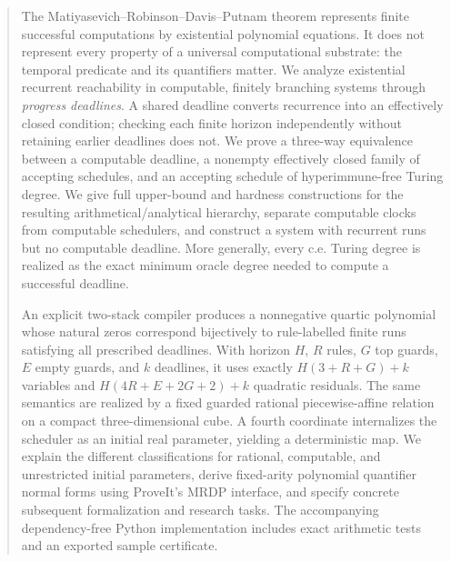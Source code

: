 \documentclass[11pt,letterpaper]{article}
\theoremstyle{definition}
\theoremstyle{remark}
\newcommand{\1}{\mathbf 1}
\begin{document}
\begin{quote}\small
The Matiyasevich--Robinson--Davis--Putnam theorem represents finite successful
computations by existential polynomial equations. It does not represent every
property of a universal computational substrate: the temporal predicate and
its quantifiers matter. We analyze existential recurrent reachability in
computable, finitely branching systems through \emph{progress deadlines}.
A shared deadline converts recurrence into an effectively closed condition;
checking each finite horizon independently without retaining earlier deadlines
does not. We prove a three-way equivalence between a computable deadline,
a nonempty effectively closed family of accepting schedules, and an accepting
schedule of hyperimmune-free Turing degree. We give full upper-bound and
hardness constructions for the resulting arithmetical/analytical hierarchy,
separate computable clocks from computable schedulers, and construct a system
with recurrent runs but no computable deadline. More generally, every c.e.
Turing degree is realized as the exact minimum oracle degree needed to
compute a successful deadline.

An explicit two-stack compiler produces a nonnegative quartic polynomial
whose natural zeros correspond bijectively to rule-labelled finite runs
satisfying all prescribed deadlines. With horizon $H$, $R$ rules, $G$ top
guards, $E$ empty guards, and $k$ deadlines, it uses exactly
$H(3+R+G)+k$ variables and $H(4R+E+2G+2)+k$ quadratic residuals.
The same semantics are realized by a fixed guarded rational piecewise-affine
relation on a compact three-dimensional cube. A fourth coordinate internalizes
the scheduler as an initial real parameter, yielding a deterministic map.
We explain the different classifications for rational, computable, and
unrestricted initial parameters, derive fixed-arity polynomial quantifier
normal forms using ProveIt's MRDP interface, and specify concrete subsequent
formalization and research tasks. The accompanying dependency-free Python
implementation includes exact arithmetic tests and an exported sample
certificate.
\end{quote}
\end{document}
